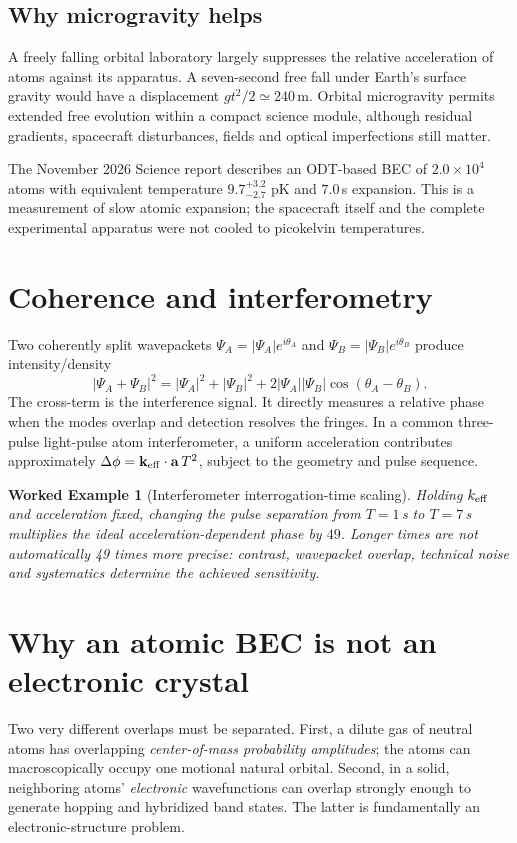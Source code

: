 \documentclass[11pt,a4paper]{article}
\newtheorem{example}{Worked Example}
\begin{document}
\subsection{Why microgravity helps}
A freely falling orbital laboratory largely suppresses the relative acceleration of atoms against its apparatus. A seven-second free fall under Earth's surface gravity would have a displacement $gt^2/2\simeq240\,$m. Orbital microgravity permits extended free evolution within a compact science module, although residual gradients, spacecraft disturbances, fields and optical imperfections still matter.

The November 2026 Science report describes an ODT-based BEC of $2.0\times10^4$ atoms with equivalent temperature $9.7^{+3.2}_{-2.7}$ pK and $7.0\,$s expansion. This is a measurement of slow atomic expansion; the spacecraft itself and the complete experimental apparatus were not cooled to picokelvin temperatures.

\section{Coherence and interferometry}
Two coherently split wavepackets $\Psi_A=|\Psi_A|e^{i\theta_A}$ and $\Psi_B=|\Psi_B|e^{i\theta_B}$ produce intensity/density
\begin{equation}
|\Psi_A+\Psi_B|^2=|\Psi_A|^2+|\Psi_B|^2+2|\Psi_A||\Psi_B|\cos(\theta_A-\theta_B).
\end{equation}
The cross-term is the interference signal. It directly measures a relative phase when the modes overlap and detection resolves the fringes. In a common three-pulse light-pulse atom interferometer, a uniform acceleration contributes approximately $\Delta\phi=\mathbf k_{\rm eff}\cdot\mathbf a\,T^2$, subject to the geometry and pulse sequence.

\begin{example}[Interferometer interrogation-time scaling]
Holding $k_{\rm eff}$ and acceleration fixed, changing the pulse separation from $T=1\,$s to $T=7\,$s multiplies the ideal acceleration-dependent phase by $49$. Longer times are not automatically 49 times more precise: contrast, wavepacket overlap, technical noise and systematics determine the achieved sensitivity.
\end{example}

\section{Why an atomic BEC is not an electronic crystal}
Two very different overlaps must be separated. First, a dilute gas of neutral atoms has overlapping \emph{center-of-mass probability amplitudes}; the atoms can macroscopically occupy one motional natural orbital. Second, in a solid, neighboring atoms' \emph{electronic} wavefunctions can overlap strongly enough to generate hopping and hybridized band states. The latter is fundamentally an electronic-structure problem.
\end{document}

